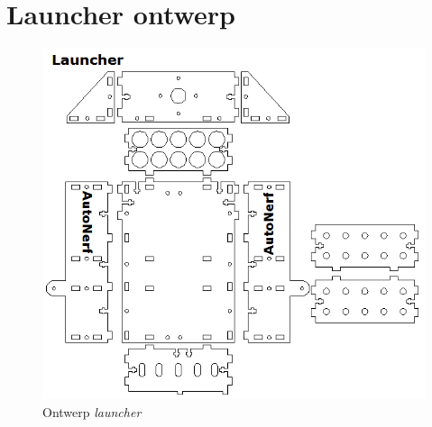 \chapter{Launcher ontwerp}
\label{app:launcher}

\begin{figure}
    \includegraphics[scale=0.5]{figures/appendix/launcher.png}
    \caption{Ontwerp \emph{launcher}}
\end{figure}
